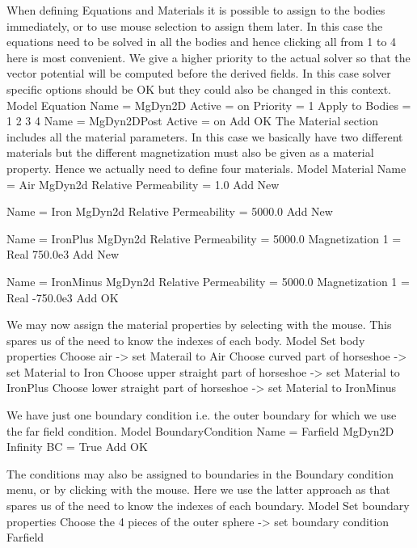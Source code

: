 When defining Equations and Materials it is possible to assign to the bodies immediately, or to use mouse
selection to assign them later. In this case the equations need to be solved in all the bodies and 
hence clicking all from 1 to 4 here is most convenient. We give a higher priority to the actual solver
so that the vector potential will be computed before the derived fields. 
In this case solver specific options should be OK but they could also be changed in this context.
\ttbegin
Model
  Equation
    Name = MgDyn2D
      Active = on
      Priority = 1
      Apply to Bodies = 1 2 3 4 
    Name = MgDyn2DPost
      Active = on
    Add 
    OK
\ttend        
The Material section includes all the material parameters. In this case we basically have two 
different materials but the different magnetization must also be given as a material property.
Hence we actually need to define four materials.  
\ttbegin
Model
  Material
    Name = Air
    MgDyn2d
      Relative Permeability = 1.0
    Add
    New

    Name = Iron
    MgDyn2d
      Relative Permeability = 5000.0
    Add
    New

    Name = IronPlus
    MgDyn2d
      Relative Permeability = 5000.0
      Magnetization 1 = Real 750.0e3
    Add
    New

    Name = IronMinus
    MgDyn2d
      Relative Permeability = 5000.0
      Magnetization 1 = Real -750.0e3
    Add
    OK
\ttend

We may now assign the material properties by selecting with the mouse.
This spares us of the 
need to know the indexes of each body.
\ttbegin
Model
  Set body properties
    Choose air -> set Materail to Air
    Choose curved part of horseshoe -> set Material to Iron
    Choose upper straight part of horseshoe -> set Material to IronPlus
    Choose lower straight part of horseshoe -> set Material to IronMinus
\ttend

We have just one boundary condition i.e. the outer boundary for which we use the far field condition.
\ttbegin
Model
  BoundaryCondition
    Name = Farfield
    MgDyn2D
      Infinity BC = True
    Add
    OK
\ttend   

The conditions may also be assigned to boundaries in the Boundary condition menu, or 
by clicking with the mouse. Here we use the latter approach as that spares us of the 
need to know the indexes of each boundary.
\ttbegin
Model
  Set boundary properties
    Choose the 4 pieces of the outer sphere -> set boundary condition Farfield
\ttend


